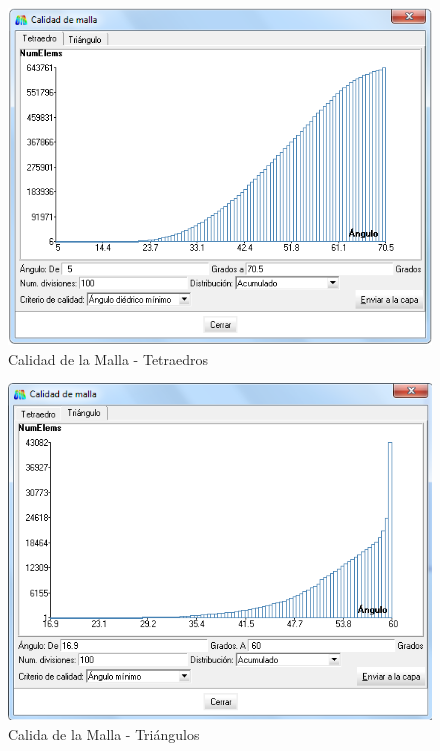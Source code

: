 \documentclass[10pt,a4paper,final]{article}
\begin{document}
\begin{figure}[tbhp]
\centerline{\includegraphics[scale=0.60]{img/cant_tetraedros}}
\caption{Calidad de la Malla - Tetraedros}
\label{calidadtetraedros}
\end{figure}

\begin{figure}[tbhp]
\centerline{\includegraphics[scale=0.60]{img/cant_triangulos}}
\caption{Calida de la Malla - Triángulos}
\label{calidadtriangulos}
\end{figure}
\end{document}

